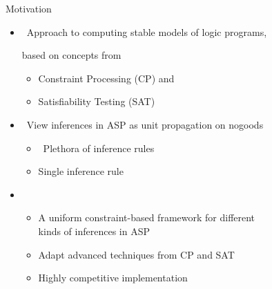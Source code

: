 \begin{frame}{Motivation}
  \bigskip
  \begin{itemize}
  \item<1-> \ Approach to computing stable models of logic programs,

    based on concepts from
    \begin{itemize}\normalsize
    \item Constraint Processing (CP) and
    \item Satisfiability Testing (SAT)
    \end{itemize}
    \medskip
  \item<1-> \ View inferences in ASP as unit propagation on nogoods
    \begin{itemize}\normalsize
    \item <only@2-3>  \ Plethora of inference rules
    \item <only@2-3>  \quad  Single inference rule
    \end{itemize}
    \medskip
  \item<only@4-> 
    \begin{itemize}\normalsize
    \item A uniform constraint-based framework for different\\ kinds of inferences in ASP
    \item Adapt advanced techniques from CP and SAT
    \item Highly competitive implementation
    \end{itemize}
  \end{itemize}
\end{frame}
%
